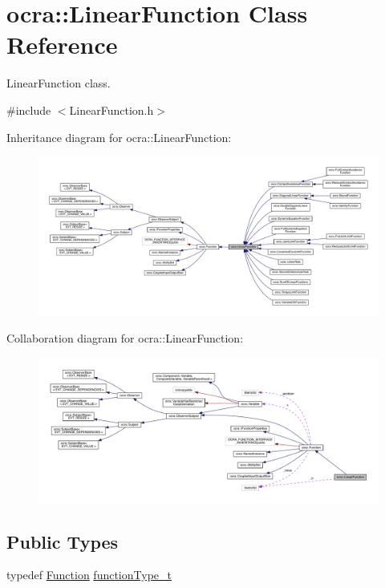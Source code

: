 \hypertarget{classocra_1_1LinearFunction}{}\section{ocra\+:\+:Linear\+Function Class Reference}
\label{classocra_1_1LinearFunction}


Linear\+Function class.  




{\ttfamily \#include $<$Linear\+Function.\+h$>$}



Inheritance diagram for ocra\+:\+:Linear\+Function\+:\nopagebreak
\begin{figure}[H]
\begin{center}
\leavevmode
\includegraphics[width=350pt]{db/d01/classocra_1_1LinearFunction__inherit__graph}
\end{center}
\end{figure}


Collaboration diagram for ocra\+:\+:Linear\+Function\+:\nopagebreak
\begin{figure}[H]
\begin{center}
\leavevmode
\includegraphics[width=350pt]{dd/d71/classocra_1_1LinearFunction__coll__graph}
\end{center}
\end{figure}
\subsection*{Public Types}
\begin{DoxyCompactItemize}
\item 
typedef \hyperlink{classocra_1_1Function}{Function} \hyperlink{classocra_1_1LinearFunction_adaf7f13c522f2001ced48c64a361c2e6}{function\+Type\+\_\+t}
\end{DoxyCompactItemize}
